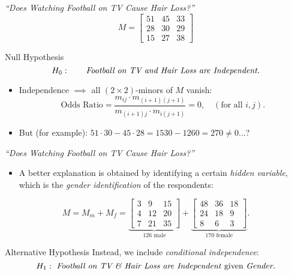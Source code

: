 \begin{frame}{\emph{``Does Watching Football on TV Cause Hair Loss?''}}
    $$ M = \begin{bmatrix} 
    51 & 45 & 33 \\ 
    28 & 30 & 29 \\ 
    15 & 27 & 38
    \end{bmatrix} $$

    \begin{block}{Null Hypothesis}
    \vspace*{-18pt}
        \begin{equation*}
            H_{0}: \qquad \text{\emph{Football on TV and Hair Loss are Independent.}}
        \end{equation*}
    \vspace*{-18pt}
    \end{block}

    \begin{itemize}
        \item Independence $\implies$ all $(2 \times 2)$-minors of $M$ vanish:
            $$ \text{Odds Ratio} = \frac{ m_{ij}\cdot m_{(i+1)(j+1)} } { m_{(i+1)j} \cdot m_{i(j+1)} } = 0, \quad (\text{for all } i,j). $$
        \item But (for example): $51 \cdot 30 - 45 \cdot 28 = 1530 - 1260 = 270 \neq 0\ldots $?
    \end{itemize}

\end{frame}

\begin{frame}{\emph{``Does Watching Football on TV Cause Hair Loss?''}}

    \begin{itemize}
        \item A better explanation is obtained by identifying a certain \emph{hidden variable}, which is the \emph{gender identification} of the respondents:
    \end{itemize}

    $$ M  = M_{m} + M_{f} = 
    \underbrace{\begin{bmatrix} 
    3 & 9 & 15 \\ 
    4 & 12 & 20 \\ 
    7 & 21 & 35
    \end{bmatrix}}_{126 \text{ male}} + 
    \underbrace{\begin{bmatrix} 
    48 & 36 & 18 \\
    24 & 18 & 9 \\
    8 & 6 & 3
    \end{bmatrix}}_{170 \text{ female}}.  $$

    \begin{block}{Alternative Hypothesis}
        Instead, we include \emph{conditional independence}:
        \begin{equation*}
            H_{1}: \text{ \emph{Football on TV \& Hair Loss are Independent} given \emph{Gender.}}
        \end{equation*}
    \end{block}

\end{frame}
